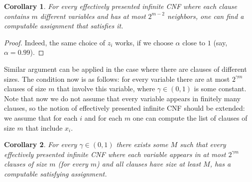 \documentclass[12pt]{article}
\newtheorem{corollary}{Corollary}
\begin{document}
\begin{corollary}
For every effectively presented infinite CNF where each clause contains $m$ different variables and has at most $2^{m-2}$ neighbors, one can find a computable
    assignment that satisfies it.
\end{corollary}

\begin{proof}
Indeed, the same choice of $z_i$ works, if we choose $\alpha$ close to $1$ (say, $\alpha=0.99$).
\end{proof}

Similar argument can be applied in the case where there are clauses
of different sizes. The condition now is as follows: for every variable there
are at most $2^{\gamma m}$ clauses of size $m$ that involve this variable,
where $\gamma\in(0,1)$ is some constant. Note that now we do not assume
that every variable appears in finitely many clauses, so the notion of
effectively presented infinite CNF should be extended: we assume that for each
$i$ and for each $m$ one can compute the list of clauses of size $m$ that
include $x_i$.

\begin{corollary}\label{variable-cnf}
    For every $\gamma\in(0,1)$ there exists some $M$ such that every effectively presented infinite CNF where each variable appears in at most $2^{\gamma m}$ clauses of size $m$ \textup(for every $m$\textup) and all clauses have size at least $M$, has a computable satisfying assignment.
\end{corollary}
\end{document}

